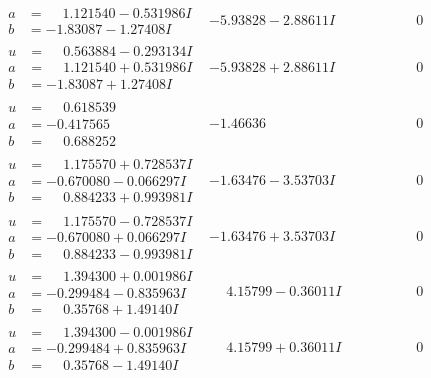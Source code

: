 \documentclass[1p]{elsarticle_modified}
\theoremstyle{definition}
\begin{document}
$$\begin{array}{c|c|c}
\begin{aligned}
a &= \phantom{-}1.121540 - 0.531986 I \\
b &= -1.83087 - 1.27408 I\end{aligned}
 & -5.93828 - 2.88611 I & \phantom{-0.000000 } 0 \\ \hline\begin{aligned}
u &= \phantom{-}0.563884 - 0.293134 I \\
a &= \phantom{-}1.121540 + 0.531986 I \\
b &= -1.83087 + 1.27408 I\end{aligned}
 & -5.93828 + 2.88611 I & \phantom{-0.000000 } 0 \\ \hline\begin{aligned}
u &= \phantom{-}0.618539\phantom{ +0.000000I} \\
a &= -0.417565\phantom{ +0.000000I} \\
b &= \phantom{-}0.688252\phantom{ +0.000000I}\end{aligned}
 & -1.46636\phantom{ +0.000000I} & \phantom{-0.000000 } 0 \\ \hline\begin{aligned}
u &= \phantom{-}1.175570 + 0.728537 I \\
a &= -0.670080 - 0.066297 I \\
b &= \phantom{-}0.884233 + 0.993981 I\end{aligned}
 & -1.63476 - 3.53703 I & \phantom{-0.000000 } 0 \\ \hline\begin{aligned}
u &= \phantom{-}1.175570 - 0.728537 I \\
a &= -0.670080 + 0.066297 I \\
b &= \phantom{-}0.884233 - 0.993981 I\end{aligned}
 & -1.63476 + 3.53703 I & \phantom{-0.000000 } 0 \\ \hline\begin{aligned}
u &= \phantom{-}1.394300 + 0.001986 I \\
a &= -0.299484 - 0.835963 I \\
b &= \phantom{-}0.35768 + 1.49140 I\end{aligned}
 & \phantom{-}4.15799 - 0.36011 I & \phantom{-0.000000 } 0 \\ \hline\begin{aligned}
u &= \phantom{-}1.394300 - 0.001986 I \\
a &= -0.299484 + 0.835963 I \\
b &= \phantom{-}0.35768 - 1.49140 I\end{aligned}
 & \phantom{-}4.15799 + 0.36011 I & \phantom{-0.000000 } 0\\

\end{array}$$
\end{document}
